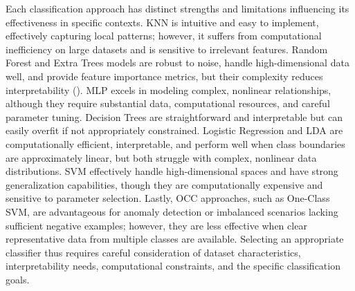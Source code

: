 \documentclass[letterpaper, notitlepage]{report}
\begin{document}
Each classification approach has distinct strengths and limitations influencing its effectiveness in specific contexts. \gls{KNN} is intuitive and easy to implement, effectively capturing local patterns; however, it suffers from computational inefficiency on large datasets and is sensitive to irrelevant features. Random Forest and Extra Trees models are robust to noise, handle high-dimensional data well, and provide feature importance metrics, but their complexity reduces interpretability (\cite{Ghazwani2023-rd}). \gls{MLP} excels in modeling complex, nonlinear relationships, although they require substantial data, computational resources, and careful parameter tuning. Decision Trees are straightforward and interpretable but can easily overfit if not appropriately constrained. Logistic Regression and \gls{LDA} are computationally efficient, interpretable, and perform well when class boundaries are approximately linear, but both struggle with complex, nonlinear data distributions. \gls{SVM} effectively handle high-dimensional spaces and have strong generalization capabilities, though they are computationally expensive and sensitive to parameter selection. Lastly, \gls{OCC} approaches, such as One-Class SVM, are advantageous for anomaly detection or imbalanced scenarios lacking sufficient negative examples; however, they are less effective when clear representative data from multiple classes are available. Selecting an appropriate classifier thus requires careful consideration of dataset characteristics, interpretability needs, computational constraints, and the specific classification goals.


\end{document}
